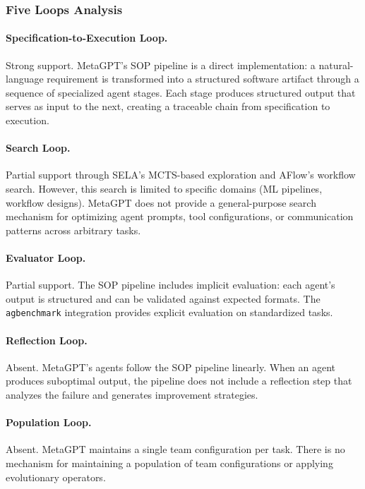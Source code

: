 \subsubsection{Five Loops Analysis}

\paragraph{Specification-to-Execution Loop.}
Strong support. MetaGPT's SOP pipeline is a direct implementation: a natural-language requirement is transformed into a structured software artifact through a sequence of specialized agent stages. Each stage produces structured output that serves as input to the next, creating a traceable chain from specification to execution.

\paragraph{Search Loop.}
Partial support through SELA's MCTS-based exploration and AFlow's workflow search. However, this search is limited to specific domains (ML pipelines, workflow designs). MetaGPT does not provide a general-purpose search mechanism for optimizing agent prompts, tool configurations, or communication patterns across arbitrary tasks.

\paragraph{Evaluator Loop.}
Partial support. The SOP pipeline includes implicit evaluation: each agent's output is structured and can be validated against expected formats. The \texttt{agbenchmark} integration provides explicit evaluation on standardized tasks.

\paragraph{Reflection Loop.}
Absent. MetaGPT's agents follow the SOP pipeline linearly. When an agent produces suboptimal output, the pipeline does not include a reflection step that analyzes the failure and generates improvement strategies.

\paragraph{Population Loop.}
Absent. MetaGPT maintains a single team configuration per task. There is no mechanism for maintaining a population of team configurations or applying evolutionary operators.

